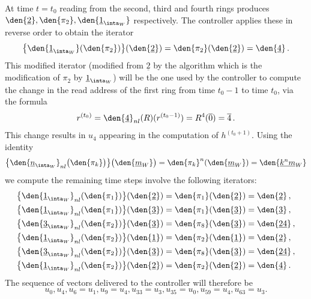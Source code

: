 At time $t = t_0$ reading from the second, third and fourth rings produces $\den{\underline{2}}, \den{\pi_2}, \den{\underline{1}_{\inta_W}}$ respectively. The controller applies these in reverse order to obtain the iterator
\[
\big\{ \den{\underline{1}_{\inta_W}}( \den{\pi_2} ) \big\}( \den{\underline{2}} ) = \den{\pi_2}( \den{\underline{2}} ) = \den{\underline{4}}\,.
\]
This modified iterator (modified from $\underline{2}$ by the algorithm which is the modification of $\pi_2$ by $\underline{1}_{\inta_W}$) will be the one used by the controller to compute the change in the read address of the first ring from time $t_0 - 1$ to time $t_0$, via the formula
\[
r^{(t_0)} = \den{\underline{4}}_{nl}(R)( r^{(t_0 - 1)} ) = R^4( \overline{0} ) = \overline{4}\,.
\]
This change results in $u_4$ appearing in the computation of $h^{(t_0+1)}$. Using the identity
\begin{gather*}
\big\{\den{\underline{n}_{\inta_W}}_{nl}\big( \den{\pi_k} \big)\big\}\big( \den{\underline{m}_W} \big) = \den{\pi_k}^n( \den{\underline{m}_W} ) = \den{\underline{k^n m}_W}
\end{gather*}
we compute the remaining time steps involve the following iterators:
\begin{align*}
\big\{ \den{\underline{1}_{\inta_W}}_{nl}( \den{\pi_1} ) \big\}( \den{\underline{2}} ) &= \den{\pi_1}( \den{\underline{2}} ) = \den{\underline{2}}\,,\\
\big\{ \den{\underline{1}_{\inta_W}}_{nl}( \den{\pi_1} ) \big\}( \den{\underline{3}} ) &= \den{\pi_1}( \den{\underline{3}} ) = \den{\underline{3}}\,,\\
\big\{ \den{\underline{3}_{\inta_W}}_{nl}( \den{\pi_2} ) \big\}( \den{\underline{3}} ) &= \den{\pi_8}( \den{\underline{3}} ) = \den{\underline{24}}\,,\\
\big\{ \den{\underline{1}_{\inta_W}}_{nl}( \den{\pi_2} ) \big\}( \den{\underline{1}} ) &= \den{\pi_2}( \den{\underline{1}} ) = \den{\underline{2}}\,,\\
\big\{ \den{\underline{3}_{\inta_W}}_{nl}( \den{\pi_2} ) \big\}( \den{\underline{3}} ) &= \den{\pi_8}( \den{\underline{3}} ) = \den{\underline{24}}\,,\\
\big\{ \den{\underline{1}_{\inta_W}}_{nl}( \den{\pi_2} ) \big\}( \den{\underline{2}} ) &= \den{\pi_2}( \den{\underline{2}} ) = \den{\underline{4}}\,.
\end{align*}
The sequence of vectors delivered to the controller will therefore be 
\[
u_0, u_4, u_6 = u_1, u_9 = u_4, u_{33} = u_3, u_{35} = u_0, u_{59} = u_4, u_{63} = u_3.
\]
